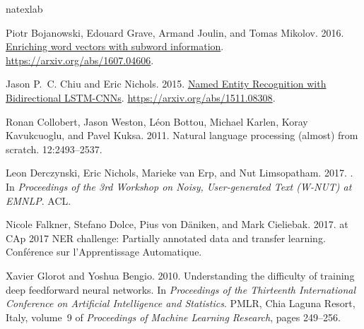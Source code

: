 \documentclass[11pt,letterpaper]{article}
\begin{document}
%

\begin{thebibliography}{}
\expandafter\ifx\csname natexlab\endcsname\relax\def\natexlab#1{#1}\fi

Piotr Bojanowski, Edouard Grave, Armand Joulin, and Tomas Mikolov. 2016.
\newblock \href{https://arxiv.org/abs/1607.04606}{Enriching word vectors with
  subword information}.
  \href{https://arxiv.org/abs/1607.04606}{https://arxiv.org/abs/1607.04606}.

Jason P.~C. {Chiu} and Eric Nichols. 2015.
\newblock \href{https://arxiv.org/abs/1511.08308}{{Named Entity Recognition
  with Bidirectional LSTM-CNNs}}.
  \href{https://arxiv.org/abs/1511.08308}{https://arxiv.org/abs/1511.08308}.

Ronan Collobert, Jason Weston, L\'{e}on Bottou, Michael Karlen, Koray
  Kavukcuoglu, and Pavel Kuksa. 2011.
\newblock Natural language processing (almost) from scratch.
 12:2493--2537.

Leon Derczynski, Eric Nichols, Marieke van Erp, and Nut Limsopatham. 2017.
.
\newblock In {\em Proceedings of the 3rd Workshop on Noisy, User-generated Text
  (W-NUT) at EMNLP\/}. ACL.

Nicole Falkner, Stefano Dolce, Pius von D\"{a}niken, and Mark Cieliebak. 2017.
 at {CAp 2017} {NER} challenge: Partially annotated
  data and transfer learning.
\newblock Conf\'{e}rence sur l'Apprentissage Automatique.

Xavier Glorot and Yoshua Bengio. 2010.
\newblock Understanding the difficulty of training deep feedforward neural
  networks.
\newblock In {\em Proceedings of the Thirteenth International Conference on
  Artificial Intelligence and Statistics\/}. PMLR, Chia Laguna Resort, Italy,
  volume~9 of {\em Proceedings of Machine Learning Research\/}, pages 249--256.


\end{thebibliography}
\end{document}
